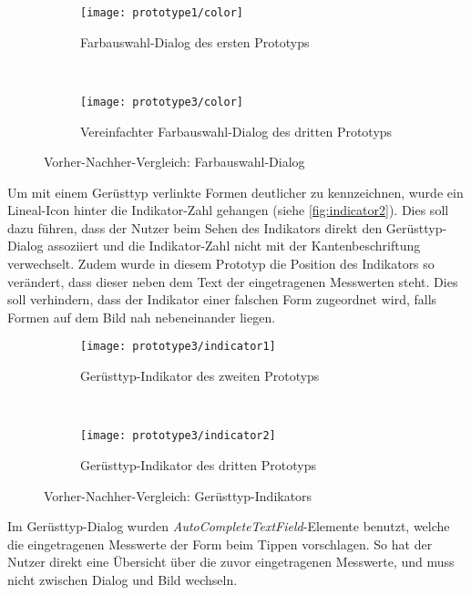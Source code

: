\begin{figure}[h]
	\begin{subfigure}[t]{0.4\textwidth}
		\centering
		\texttt{[image: prototype1/color]}
		\caption{Farbauswahl-Dialog des ersten Prototyps}
		\label{fig:color1}
	\end{subfigure}
	~
	\begin{subfigure}[t]{0.4\textwidth}
		\centering
		\texttt{[image: prototype3/color]}
		\caption{Vereinfachter Farbauswahl-Dialog des dritten Prototyps}
		\label{fig:color3}
	\end{subfigure}
	\centering
	\caption{Vorher-Nachher-Vergleich: Farbauswahl-Dialog}
\end{figure}

Um mit einem Gerüsttyp verlinkte Formen deutlicher zu kennzeichnen, wurde ein Lineal-Icon hinter die Indikator-Zahl gehangen (siehe \autoref{fig:indicator2}).
Dies soll dazu führen, dass der Nutzer beim Sehen des Indikators direkt den Gerüsttyp-Dialog assoziiert und die Indikator-Zahl nicht mit der Kantenbeschriftung verwechselt.
Zudem wurde in diesem Prototyp die Position des Indikators so verändert, dass dieser neben dem Text der eingetragenen Messwerten steht.
Dies soll verhindern, dass der Indikator einer falschen Form zugeordnet wird, falls Formen auf dem Bild nah nebeneinander liegen. \\

\begin{figure}[h]
	\begin{subfigure}[t]{0.4\textwidth}
		\centering
		\texttt{[image: prototype3/indicator1]}
		\caption{Gerüsttyp-Indikator des zweiten Prototyps}
		\label{fig:indicator1}
	\end{subfigure}
	~
	\begin{subfigure}[t]{0.4\textwidth}
		\centering
		\texttt{[image: prototype3/indicator2]}
		\caption{Gerüsttyp-Indikator des dritten Prototyps}
		\label{fig:indicator2}
	\end{subfigure}
	\centering
	\caption{Vorher-Nachher-Vergleich: Gerüsttyp-Indikators}
	\label{fig:indicators}
\end{figure}

Im Gerüsttyp-Dialog wurden \emph{AutoCompleteTextField}-Elemente benutzt, welche die eingetragenen Messwerte der Form beim Tippen vorschlagen.
So hat der Nutzer direkt eine Übersicht über die zuvor eingetragenen Messwerte, und muss nicht zwischen Dialog und Bild wechseln. \\

